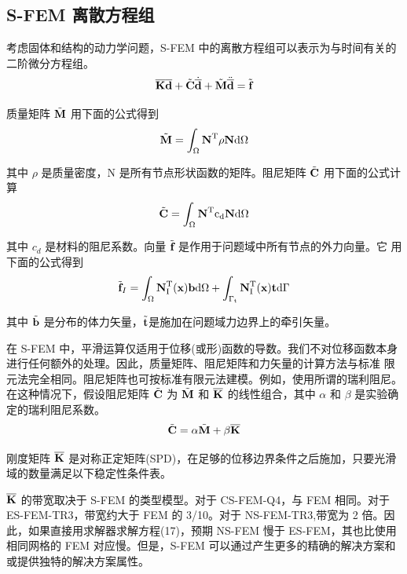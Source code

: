 \documentclass[12pt,a4paper]{article}
\begin{document}
\subsection{S-FEM 离散方程组}
考虑固体和结构的动力学问题，S-FEM 中的离散方程组可以表示为与时间有关的二阶微分方程组。
\begin{equation}
\overline{\rm\textbf{K}}\overline{\rm\textbf{d}}+\tilde{\rm\textbf{C}}\dot{\overline{\rm\textbf{d}}}+\tilde{\rm\textbf{M}}\ddot{\overline{\rm\textbf{d}}}=\tilde{\rm\textbf{f}}
\end{equation}

质量矩阵 $\tilde{\rm\textbf{M}}$ 用下面的公式得到
\begin{equation}
\tilde{\rm\textbf{M}}=\int_{\Omega}^{}\rm\textbf{N}^T\rho\rm\textbf{N}d\Omega 
\end{equation}

其中 $\rho$ 是质量密度，N 是所有节点形状函数的矩阵。阻尼矩阵 $\tilde{\rm\textbf{C}}$ 用下面的公式计算
\begin{equation}
\tilde{\rm\textbf{C}}=\int_{\Omega}^{}\rm\textbf{N}^T c_d\rm\textbf{N}d\Omega
\end{equation}

其中 $c_d$ 是材料的阻尼系数。向量 $\tilde{\rm\textbf{f}}$ 是作用于问题域中所有节点的外力向量。它
用下面的公式得到
\begin{equation}
\tilde{\rm\textbf{f}}_I=\int_{\Omega}^{}\rm\textbf{N}^T_I(\rm\textbf{x})\rm\textbf{b}d\Omega+\int_{\Gamma _t}^{}\rm\textbf{N}^T_I(\rm\textbf{x})\rm\textbf{t}d\Gamma
\end{equation}

其中 $\tilde{\rm\textbf{b}}$ 是分布的体力矢量，$\tilde{\rm\textbf{t}}$是施加在问题域力边界上的牵引矢量。

在 S-FEM 中，平滑运算仅适用于位移(或形)函数的导数。我们不对位移函数本身进行任何额外的处理。因此，质量矩阵、阻尼矩阵和力矢量的计算方法与标准
限元法完全相同。阻尼矩阵也可按标准有限元法建模。例如，使用所谓的瑞利阻尼。在这种情况下，假设阻尼矩阵 $\tilde{\rm\textbf{C}}$ 为 $\tilde{\rm\textbf{M}}$ 和 $\overline{\rm\textbf{K}}$ 的线性组合，其中 $\alpha$ 和 $\beta$ 是实验确定的瑞利阻尼系数。
\begin{equation}
\tilde{\rm\textbf{C}}=\alpha\tilde{\rm\textbf{M}}+\beta\overline{\rm\textbf{K}}
\end{equation}

刚度矩阵 $\overline{\rm\textbf{K}}$ 是对称正定矩阵(SPD)，在足够的位移边界条件之后施加，只要光滑域的数量满足以下稳定性条件表。

$\overline{\rm\textbf{K}}$ 的带宽取决于 S-FEM 的类型模型。对于 CS-FEM-Q4，与 FEM 相同。对于 ES-FEM-TR3，带宽约大于 FEM 的 3/10。对于 NS-FEM-TR3,带宽为 2 倍。因此，如果直接用求解器求解方程(17)，预期 NS-FEM 慢于 ES-FEM，其也比使用相同网格的 FEM 对应慢。但是，S-FEM 可以通过产生更多的精确的解决方案和或提供独特的解决方案属性。
\end{document}
